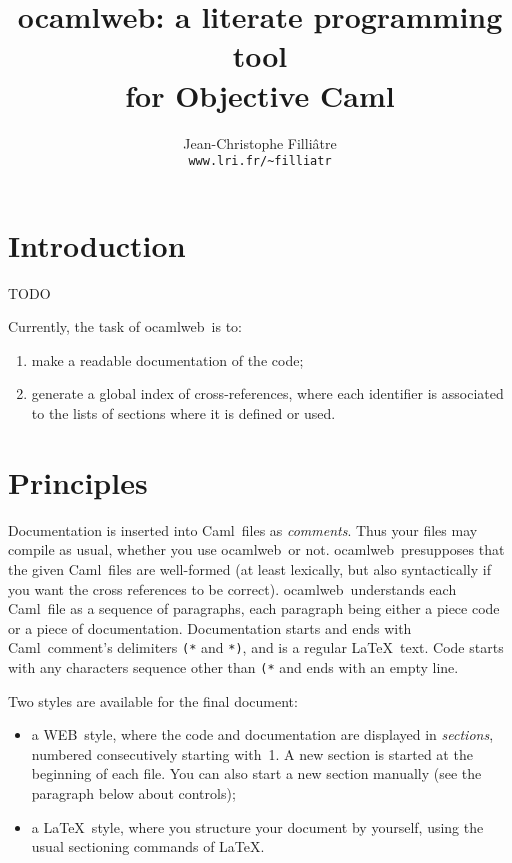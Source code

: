 \documentclass[12pt]{article}
\newcommand{\WEB}{\textsf{WEB}}
\newcommand{\Caml}{\textsf{Caml}}
\newcommand{\ocamlweb}{\textsf{ocamlweb}}
\begin{document}
\title{ocamlweb: a literate programming tool \\ 
               for Objective Caml}
\author{Jean-Christophe Filli\^{a}tre \\
        \normalsize\texttt{www.lri.fr/\~{}filliatr}}
\date{}
\maketitle

\section{Introduction}

TODO

Currently, the task of \ocamlweb\ is to:
\begin{enumerate}
\item make a readable documentation of the code;
\item generate a global index of cross-references, where each identifier is
  associated to the lists of sections where it is defined or used.
\end{enumerate}



\section{Principles}

Documentation is inserted into \Caml\ files as \emph{comments}.  Thus
your files may compile as usual, whether you use \ocamlweb\ or not.
\ocamlweb\ presupposes that the given \Caml\ files are well-formed (at
least lexically, but also syntactically if you want the cross
references to be correct).  \ocamlweb\ understands each \Caml\ file as
a sequence of paragraphs, each paragraph being either a piece code or a
piece of documentation.  Documentation starts and ends with \Caml\ 
comment's delimiters \texttt{(*} and \texttt{*)}, and is a regular
\LaTeX\ text. Code starts with any characters sequence other than
\texttt{(*} and ends with an empty line.

Two styles are available for the final document:
\begin{itemize}
  
\item a \WEB\ style, where the code and documentation are displayed in
  \emph{sections}, numbered consecutively starting with~1.  A new
  section is started at the beginning of each file. You can also start
  a new section manually (see the paragraph below about controls);

\item a \LaTeX\ style, where you structure your document by yourself,
  using the usual sectioning commands of \LaTeX. 

\end{itemize}
\end{document}
